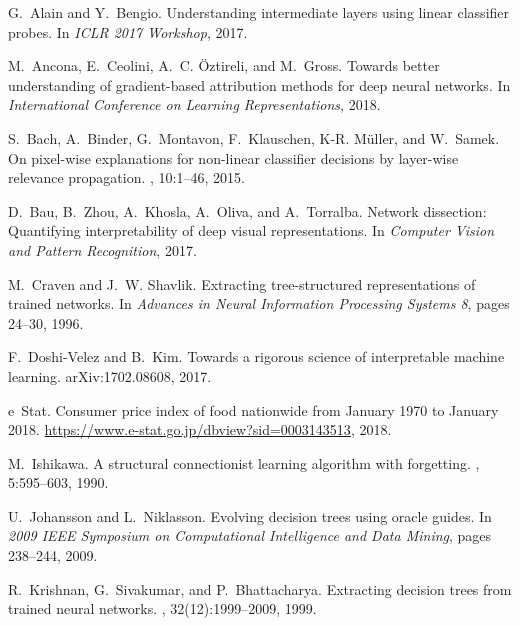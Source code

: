 \documentclass{article}
\begin{document}
\clearpage
\begin{thebibliography}{10}

G.~Alain and Y.~Bengio.
\newblock Understanding intermediate layers using linear classifier probes.
\newblock In {\em ICLR 2017 Workshop}, 2017.

M.~Ancona, E.~Ceolini, A.~C. {\"O}ztireli, and M.~Gross.
\newblock Towards better understanding of gradient-based attribution methods
  for deep neural networks.
\newblock In {\em International Conference on Learning Representations}, 2018.

S.~Bach, A.~Binder, G.~Montavon, F.~Klauschen, K-R. M{\"u}ller, and W.~Samek.
\newblock On pixel-wise explanations for non-linear classifier decisions by
  layer-wise relevance propagation.
, 10:1--46, 2015.

D.~Bau, B.~Zhou, A.~Khosla, A.~Oliva, and A.~Torralba.
\newblock Network dissection: Quantifying interpretability of deep visual
  representations.
\newblock In {\em Computer Vision and Pattern Recognition}, 2017.

M.~Craven and J.~W. Shavlik.
\newblock Extracting tree-structured representations of trained networks.
\newblock In {\em Advances in Neural Information Processing Systems 8}, pages
  24--30, 1996.

F.~Doshi-Velez and B.~Kim.
\newblock Towards a rigorous science of interpretable machine learning.
\newblock arXiv:1702.08608, 2017.

e~{S}tat.
\newblock Consumer price index of food nationwide from {J}anuary 1970 to
  {J}anuary 2018.
\newblock \url{https://www.e-stat.go.jp/dbview?sid=0003143513}, 2018.

M.~Ishikawa.
\newblock A structural connectionist learning algorithm with forgetting.
,
  5:595--603, 1990.

U.~Johansson and L.~Niklasson.
\newblock Evolving decision trees using oracle guides.
\newblock In {\em 2009 IEEE Symposium on Computational Intelligence and Data
  Mining}, pages 238--244, 2009.

R.~Krishnan, G.~Sivakumar, and P.~Bhattacharya.
\newblock Extracting decision trees from trained neural networks.
, 32(12):1999--2009, 1999.


\end{thebibliography}
\end{document}
